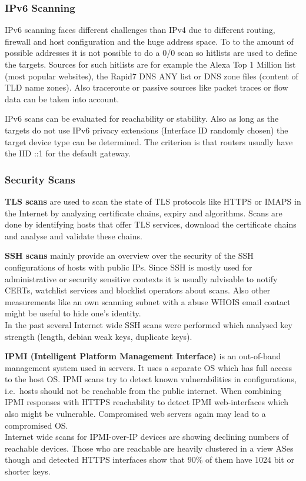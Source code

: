 \subsubsection*{IPv6 Scanning}
IPv6 scanning faces different challenges than IPv4 due to different routing, firewall and host configuration and the huge address space.
To to the amount of possible addresses it is not possible to do a 0/0 scan so hitlists are used to define the targets.
Sources for such hitlists are for example the Alexa Top 1 Million list (most popular websites), the Rapid7 DNS ANY list or DNS zone files (content of TLD name zones).
Also traceroute or passive sources like packet traces or flow data can be taken into account.\\
\vspace{4pt}

IPv6 scans can be evaluated for reachability or stability.
Also as long as the targets do not use IPv6 privacy extensions (Interface ID randomly chosen) the target device type can be determined.
The criterion is that routers usually have the IID ::1 for the default gateway.

\subsubsection*{Security Scans}
\textbf{TLS scans} are used to scan the state of TLS protocols like HTTPS or IMAPS in the Internet by analyzing certificate chains, expiry and algorithms.
Scans are done by identifying hosts that offer TLS services, download the certificate chains and analyse and validate these chains.\\
\vspace{4pt}

\textbf{SSH scans} mainly provide an overview over the security of the SSH configurations of hosts with public IPs.
Since SSH is mostly used for administrative or security sensitive contexts it is usually advisable to notify CERTs, watchlist services and blocklist operators about scans.
Also other measurements like an own scanning subnet with a abuse WHOIS email contact might be useful to hide one's identity.\\
In the past several Internet wide SSH scans were performed which analysed key strength (length, debian weak keys, duplicate keys).\\
\vspace{4pt}

\textbf{IPMI (Intelligent Platform Management Interface)} is an out-of-band management system used in servers.
It uses a separate OS which has full access to the host OS\@.
IPMI scans try to detect known vulnerabilities in configurations, i.e.\ hosts should not be reachable from the public internet.
When combining IPMI responses with HTTPS reachability to detect IPMI web-interfaces which also might be vulnerable.
Compromised web servers again may lead to a compromised OS.\\
Internet wide scans for IPMI-over-IP devices are showing declining numbers of reachable devices.
Those who are reachable are heavily clustered in a view ASes though and detected HTTPS interfaces show that 90\% of them have 1024 bit or shorter keys.\\


